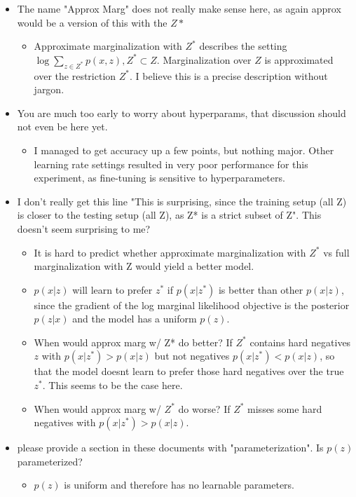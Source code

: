 \documentclass[11pt]{article}
\begin{document}
\begin{itemize}
\begin{itemize}
    \end{itemize}
\item The name "Approx Marg" does not really make sense here, as again approx would be a version of this with the $Z*$
    \begin{itemize}
    \item Approximate marginalization with $Z^*$ describes the setting $\log\sum_{z\in Z^*} p(x,z), Z^*\subset Z$.
        Marginalization over $Z$ is approximated over the restriction $Z^*$.
        I believe this is a precise description without jargon.
    \end{itemize}
\item You are much too early to worry about hyperparams, that discussion should not even be here yet.
    \begin{itemize}
    \item I managed to get accuracy up a few points, but nothing major. Other learning rate
        settings resulted in very poor performance for this experiment,
        as fine-tuning is sensitive to hyperparameters.
    \end{itemize}
\item I don't really get this line "This is surprising, since the training setup (all Z) is closer to the testing setup (all Z), as Z* is a strict subset of Z". This doesn't seem surprising to me?
    \begin{itemize}
    \item It is hard to predict whether approximate marginalization with $Z^*$
        vs full marginalization with Z would yield a better model.
    \item $p(x|z)$ will learn to prefer $z^*$ if $p(x|z^*)$ is better than other $p(x|z)$,
        since the gradient of the log marginal likelihood objective is the posterior $p(z|x)$
        and the model has a uniform $p(z)$.
    \item When would approx marg w/ Z* do better?
        If $Z^*$ contains hard negatives $z$ with $p(x | z^*) > p(x | z)$ but not negatives $p(x | z^*) < p(x | z)$,
        so that the model doesnt learn to prefer those hard negatives over the true $z^*$.
        This seems to be the case here.
    \item When would approx marg w/ $Z^*$ do worse?
        If $Z^*$ misses some hard negatives with $p(x | z^*) > p(x | z)$.
    \end{itemize}
\item please provide a section in these documents with "parameterization". Is $p(z)$ parameterized?
    \begin{itemize}
    \item $p(z)$ is uniform and therefore has no learnable parameters.
    \end{itemize}
\end{itemize}
\end{document}
